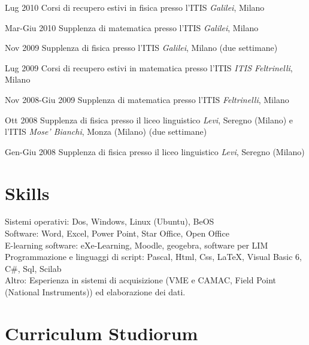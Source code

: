 \begin{CV}
	\item[Lug 2010] Corsi di recupero estivi in fisica presso l'ITIS {\em Galilei}, Milano
	
	\item[Mar-Giu 2010] Supplenza di matematica presso l'ITIS {\em Galilei}, Milano
	
	\item[Nov 2009] Supplenza di fisica presso l'ITIS {\em Galilei}, Milano (due settimane)
	
	\item[Lug 2009] Corsi di recupero estivi in matematica presso l'ITIS {\em ITIS Feltrinelli}, Milano
	
	\item[Nov 2008-Giu 2009] Supplenza di matematica presso l'ITIS {\em Feltrinelli}, Milano
	
	\item[Ott 2008] Supplenza di fisica presso il liceo linguistico {\em Levi}, Seregno (Milano) e l'ITIS {\em Mose' Bianchi}, Monza (Milano) (due settimane)
	
	\item[Gen-Giu 2008] Supplenza di fisica presso il liceo linguistico {\em Levi}, Seregno (Milano)
	
\end{CV}

\section{Skills}
Sistemi operativi: Dos, Windows, Linux (Ubuntu), BeOS\\
Software: Word, Excel, Power Point, Star Office, Open Office\\
E-learning software: eXe-Learning, Moodle, geogebra, software per LIM\\
Programmazione e linguaggi di script: Pascal, Html, Css, \LaTeX, Visual Basic 6, C\#, Sql, Scilab\\
Altro: Esperienza in sistemi di acquisizione (VME e CAMAC, Field Point (National Instruments)) ed elaborazione dei dati.

\section{Curriculum Studiorum}


